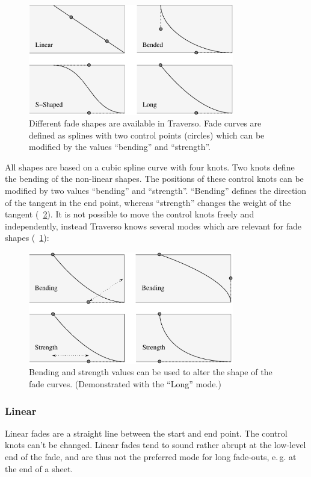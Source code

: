 \begin{figure}[t]
 \centering\includegraphics[width=0.8\textwidth]{../images/fades}
 \caption{Different fade shapes are available in Traverso. Fade curves are defined as splines with two control points (circles) which can be modified by the values ``bending'' and ``strength''.}
 \label{fig_fades01}
\end{figure}

All shapes are based on a cubic spline curve with four knots. Two knots define the bending of the non-linear shapes. The positions of these control knots can be modified by two values ``bending'' and ``strength''. ``Bending'' defines the direction of the tangent in the end point, whereas ``strength'' changes the weight of the tangent (\FigB~\ref{fig_fades02}). It is not possible to move the control knots freely and independently, instead Traverso knows several modes which are relevant for fade shapes (\FigB~\ref{fig_fades01}):

\begin{figure}[t]
 \centering\includegraphics[width=0.8\textwidth]{../images/fades2}
 \caption{Bending and strength values can be used to alter the shape of the fade curves. (Demonstrated with the ``Long'' mode.)}
 \label{fig_fades02}
\end{figure}

\subsubsection{Linear}
Linear fades are a straight line between the start and end point. The control knots can't be changed. Linear fades tend to sound rather abrupt at the low-level end of the fade, and are thus not the preferred mode for long fade-outs, e.\,g. at the end of a sheet.

